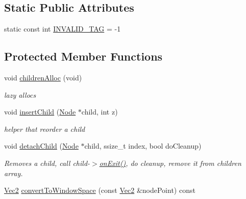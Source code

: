 \subsection*{Static Public Attributes}
\begin{DoxyCompactItemize}
\item 
static const int \hyperlink{classNode_aa8e6bb26098082b3d5bd5b6ba89e48c8}{I\+N\+V\+A\+L\+I\+D\+\_\+\+T\+AG} = -\/1
\end{DoxyCompactItemize}
\subsection*{Protected Member Functions}
\begin{DoxyCompactItemize}
\item 
\mbox{\label{classNode_a6aeb29ea076a2a5cf6fc40ec7b4348ca}} 
void \hyperlink{classNode_a6aeb29ea076a2a5cf6fc40ec7b4348ca}{children\+Alloc} (void)
\begin{DoxyCompactList}\small\item\em lazy allocs \end{DoxyCompactList}\item 
\mbox{\label{classNode_aeb54cf6025e99d8ac7f86c4549781fff}} 
void \hyperlink{classNode_aeb54cf6025e99d8ac7f86c4549781fff}{insert\+Child} (\hyperlink{classNode}{Node} $\ast$child, int z)
\begin{DoxyCompactList}\small\item\em helper that reorder a child \end{DoxyCompactList}\item 
\mbox{\label{classNode_a28508e2bfd951d040c84f26bc5ca8a15}} 
void \hyperlink{classNode_a28508e2bfd951d040c84f26bc5ca8a15}{detach\+Child} (\hyperlink{classNode}{Node} $\ast$child, ssize\+\_\+t index, bool do\+Cleanup)
\begin{DoxyCompactList}\small\item\em Removes a child, call child-\/$>$\hyperlink{classNode_ac83de835ea315e3179d4293acd8903ac}{on\+Exit()}, do cleanup, remove it from children array. \end{DoxyCompactList}\item 
\mbox{\label{classNode_a5714faff2a8e1c11d0c1063bbebb7e8e}} 
\hyperlink{classVec2}{Vec2} \hyperlink{classNode_a5714faff2a8e1c11d0c1063bbebb7e8e}{convert\+To\+Window\+Space} (const \hyperlink{classVec2}{Vec2} \&node\+Point) const

\end{DoxyCompactItemize}
